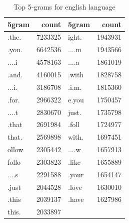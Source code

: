 \documentclass[a4paper,11pt]{article}
\begin{document}
\begin{table}
\centering
\begin{tabular}{|l|r||l|r|}
\hline
5gram & count & 5gram & count \\
\hline
.the. & 7233325 & ight. & 1943931 \\
.you. & 6642536 & ....m & 1943566 \\
....i & 4578163 & ....a & 1861019 \\
.and. & 4160015 & .with & 1828758 \\
...i. & 3186708 & .i.m. & 1815360 \\
.for. & 2966322 & e.you & 1750457 \\
....t & 2830670 & just. & 1735798 \\
.that & 2691984 & .foll & 1724977 \\
that. & 2569898 & with. & 1697451 \\
ollow & 2305442 & ....w & 1657913 \\
follo & 2303823 & .like & 1655889 \\
....s & 2291588 & .your & 1654147 \\
.just & 2044528 & .love & 1630010 \\
.this & 2039137 & .have & 1627986 \\
this. & 2033897 & \\
\hline
\end{tabular}
\caption{Top 5-grams for english language}
\label{5grams}
\end{table}
\end{document}
